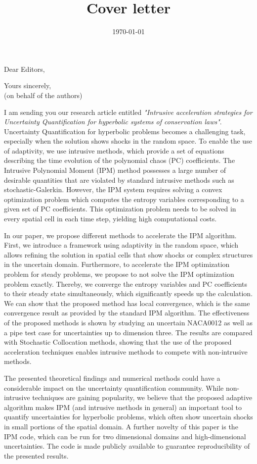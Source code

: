 \documentclass[10pt,a4paper,roman]{moderncv}        %
\title{Cover letter}                               %
\begin{document}
\recipient{~}{}
\date{\today}
\opening{Dear Editors,}
\closing{Yours sincerely, \\ (on behalf of the authors)}
\makelettertitle

I am sending you our research article entitled \textit{"Intrusive acceleration strategies for Uncertainty Quantification for hyperbolic systems of conservation laws"}. Uncertainty Quantification for hyperbolic problems becomes a challenging task, especially when the solution shows shocks in the random space. To enable the use of adaptivity, we use intrusive methods, which provide a set of equations describing the time evolution of the polynomial chaos (PC) coefficients. The Intrusive Polynomial Moment (IPM) method possesses a large number of desirable quantities that are violated by standard intrusive methods such as stochastic-Galerkin. However, the IPM system requires solving a convex optimization problem which computes the entropy variables corresponding to a given set of PC coefficients. This optimization problem needs to be solved in every spatial cell in each time step, yielding high computational costs.

In our paper, we propose different methods to accelerate the IPM algorithm. First, we introduce a framework using adaptivity in the random space, which allows refining the solution in spatial cells that show shocks or complex structures in the uncertain domain. Furthermore, to accelerate the IPM optimization problem for steady problems, we propose to not solve the IPM optimization problem exactly. Thereby, we converge the entropy variables and PC coefficients to their steady state simultaneously, which significantly speeds up the calculation. We can show that the proposed method has local convergence, which is the same convergence result as provided by the standard IPM algorithm. The effectiveness of the proposed methods is shown by studying an uncertain NACA0012 as well as a pipe test case for uncertainties up to dimension three. The results are compared with Stochastic Collocation methods, showing that the use of the proposed acceleration techniques enables intrusive methods to compete with non-intrusive methods. 

The presented theoretical findings and numerical methods could have a considerable impact on the uncertainty quantification community. While non-intrusive techniques are gaining popularity, we believe that the proposed adaptive algorithm makes IPM (and intrusive methods in general) an important tool to quantify uncertainties for hyperbolic problems, which often show uncertain shocks in small portions of the spatial domain. A further novelty of this paper is the IPM code, which can be run for two dimensional domains and high-dimensional uncertainties. The code is made publicly available to guarantee reproducibility of the presented results.
\end{document}
